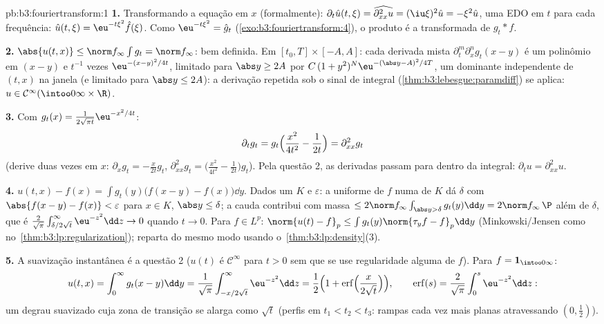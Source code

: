 \begin{solution}{pb:b3:fouriertransform:1}
\textbf{1.} Transformando a equação em $x$ (formalmente):
$\partial_t\hat u(t,\xi) = \widehat{\partial^2_{xx}u} =
(\iu\xi)^2\hat u = -\xi^2\hat u$, uma EDO em $t$ para cada
frequência: $\hat u(t,\xi) = \eu^{-t\xi^2}\hat f(\xi)$. Como
$\eu^{-t\xi^2} = \hat g_t$
(\cref{exo:b3:fouriertransform:4}), o produto é a
transformada de $g_t * f$.

\textbf{2.} $\abs{u(t,x)} \leq \norm f_\infty\int g_t = \norm
f_\infty$: bem definida. Em $[t_0, T]\times[-A, A]$: cada
derivada mista $\partial^m_t\partial^n_xg_t(x - y)$ é um
polinômio em $(x - y)$ e $t^{-1}$ vezes
$\eu^{-(x-y)^2/4t}$, limitado para $\abs y \geq 2A$ por
$C\,(1 + y^2)^N\eu^{-(\abs y - A)^2/4T}$, um dominante 
independente de $(t, x)$ na janela (e limitado
para $\abs y \leq 2A$): a derivação repetida sob o sinal de
integral (\cref{thm:b3:lebesgue:paramdiff}) se aplica: $u \in
\mathcal C^\infty(\intoo0\infty\times\R)$.

\textbf{3.} Com $g_t(x) = \frac1{2\sqrt{\pi
t}}\eu^{-x^2/4t}$:
\[
\partial_tg_t = g_t\Bigl(\frac{x^2}{4t^2} - \frac1{2t}\Bigr)
= \partial^2_{xx}g_t
\]
(derive duas vezes em $x$: $\partial_xg_t = -\frac
x{2t}g_t$, $\partial^2_{xx}g_t = \bigl(\frac{x^2}{4t^2} -
\frac1{2t}\bigr)g_t$). Pela questão 2, as derivadas passam
para dentro da integral: $\partial_tu = \partial^2_{xx}u$.

\textbf{4.} $u(t,x) - f(x) = \int g_t(y)\bigl(f(x - y) -
f(x)\bigr)\dd y$. Dados um  $K$ e $\varepsilon$:
a  uniforme de $f$ numa  de $K$ dá
$\delta$ com $\abs{f(x-y) - f(x)} < \varepsilon$ para $x \in
K$, $\abs y \leq \delta$; a cauda contribui com massa $\leq 2\norm
f_\infty\int_{\abs y > \delta}g_t(y)\dd y = 2\norm
f_\infty\,\P$ além de $\delta$, que é
$\frac2{\sqrt\pi}\int_{\delta/2\sqrt t}^\infty\eu^{-z^2}\dd z
\to 0$ quando $t \to 0$. Para $f \in L^p$: $\norm{u(t) - f}_p \leq
\int g_t(y)\norm{\tau_yf - f}_p\dd y$ (Minkowski/Jensen como no~\cref{thm:b3:lp:regularization}); reparta do mesmo modo usando o~\cref{thm:b3:lp:density}(3).

\textbf{5.} A suavização instantânea é a questão 2 ($u(t)$ é
$\mathcal C^\infty$ para $t > 0$ sem que se use regularidade alguma de $f$).
Para $f = \mathbf 1_{\intoo0\infty}$:
\[
u(t, x) = \int_0^\infty g_t(x - y)\dd y
= \frac1{\sqrt\pi}\int_{-x/2\sqrt t}^{\infty}\eu^{-z^2}\dd z
= \frac12\Bigl(1 +
\operatorname{erf}\Bigl(\frac{x}{2\sqrt t}\Bigr)\Bigr),
\qquad \operatorname{erf}(s) =
\frac2{\sqrt\pi}\int_0^s\eu^{-z^2}\dd z :
\]
um degrau suavizado cuja zona de transição se alarga como $\sqrt t$
(perfis em $t_1 < t_2 < t_3$: rampas cada vez mais planas atravessando
$(0, \frac12)$).


\end{solution}
